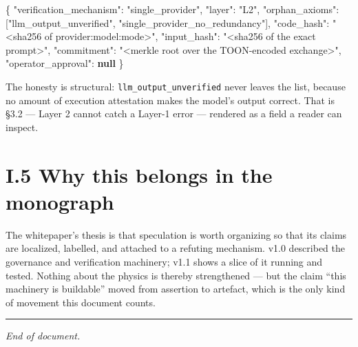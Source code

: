 \documentclass[
  11pt]{report}
\newenvironment{Shaded}{}{}
\newcommand{\DataTypeTok}[1]{\textcolor[rgb]{0.56,0.13,0.00}{#1}}
\newcommand{\FunctionTok}[1]{\textcolor[rgb]{0.02,0.16,0.49}{#1}}
\newcommand{\KeywordTok}[1]{\textcolor[rgb]{0.00,0.44,0.13}{\textbf{#1}}}
\newcommand{\OtherTok}[1]{\textcolor[rgb]{0.00,0.44,0.13}{#1}}
\newcommand{\StringTok}[1]{\textcolor[rgb]{0.25,0.44,0.63}{#1}}
\begin{document}
\begin{Shaded}
\begin{Highlighting}[]
\FunctionTok{\{}
  \DataTypeTok{"verification\_mechanism"}\FunctionTok{:} \StringTok{"single\_provider"}\FunctionTok{,}
  \DataTypeTok{"layer"}\FunctionTok{:} \StringTok{"L2"}\FunctionTok{,}
  \DataTypeTok{"orphan\_axioms"}\FunctionTok{:} \OtherTok{[}\StringTok{"llm\_output\_unverified"}\OtherTok{,} \StringTok{"single\_provider\_no\_redundancy"}\OtherTok{]}\FunctionTok{,}
  \DataTypeTok{"code\_hash"}\FunctionTok{:}  \StringTok{"\textless{}sha256 of provider:model:mode\textgreater{}"}\FunctionTok{,}
  \DataTypeTok{"input\_hash"}\FunctionTok{:} \StringTok{"\textless{}sha256 of the exact prompt\textgreater{}"}\FunctionTok{,}
  \DataTypeTok{"commitment"}\FunctionTok{:} \StringTok{"\textless{}merkle root over the TOON{-}encoded exchange\textgreater{}"}\FunctionTok{,}
  \DataTypeTok{"operator\_approval"}\FunctionTok{:} \KeywordTok{null}
\FunctionTok{\}}
\end{Highlighting}
\end{Shaded}

The honesty is structural: \texttt{llm\_output\_unverified} never leaves
the list, because no amount of execution attestation makes the model's
output correct. That is §3.2 --- Layer 2 cannot catch a Layer-1 error
--- rendered as a field a reader can inspect.

\hypertarget{i.5-why-this-belongs-in-the-monograph}{%
\section{I.5 Why this belongs in the
monograph}\label{i.5-why-this-belongs-in-the-monograph}}

The whitepaper's thesis is that speculation is worth organizing so that
its claims are localized, labelled, and attached to a refuting
mechanism. v1.0 described the governance and verification machinery;
v1.1 shows a slice of it running and tested. Nothing about the physics
is thereby strengthened --- but the claim ``this machinery is
buildable'' moved from assertion to artefact, which is the only kind of
movement this document counts.

\begin{center}\rule{0.5\linewidth}{0.5pt}\end{center}

\emph{End of document.}
\end{document}
